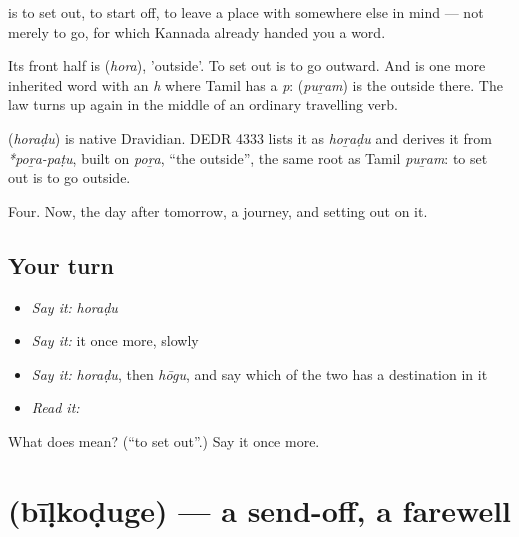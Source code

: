  is to set out, to start off, to leave a place with somewhere else in mind — not merely to go, for which Kannada already handed you a word.

Its front half is  (\emph{hora}), 'outside'. To set out is to go outward. And  is one more inherited word with an \emph{h} where Tamil has a \emph{p}:  (\emph{puṟam}) is the outside there. The law turns up again in the middle of an ordinary travelling verb.

\begin{cousinweb}
\textbf{} (\emph{horaḍu}) is native Dravidian. DEDR 4333 lists it as \emph{hoṟaḍu} and derives it from \emph{*poṟa-paṭu}, built on \emph{poṟa}, \textquotedblleft{}the outside\textquotedblright{}, the same root as Tamil \emph{puṟam}: to set out is to go outside.
\end{cousinweb}

\begin{grammarlens}[title={What you've built}]
Four. Now, the day after tomorrow, a journey, and setting out on it.
\end{grammarlens}

\subsection*{Your turn}
\begin{itemize}
\raggedright
  \item \emph{Say it:} \emph{horaḍu}
  \item \emph{Say it:} it once more, slowly
  \item \emph{Say it:} \emph{horaḍu}, then \emph{hōgu}, and say which of the two has a destination in it
  \item \emph{Read it:} \textbf{}
\end{itemize}

\begin{tcolorbox}[breakable,colback=teal!4,colframe=teal!35!black,title={Before you move on}]
What does  mean? (\textquotedblleft{}to set out\textquotedblright{}.) Say it once more.
\end{tcolorbox}
\section[\texorpdfstring{\kn{ಬೀಳ್ಕೊಡುಗೆ} (bīḷkoḍuge)}{ಬೀಳ್ಕೊಡುಗೆ (bīḷkoḍuge)}]{ (bīḷkoḍuge) — a send-off, a farewell}

\label{lesson:KA-C50-farewell}



